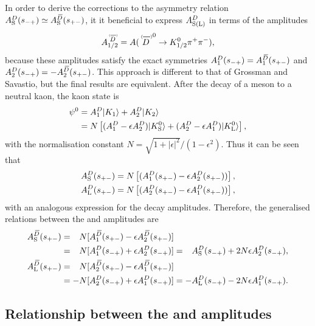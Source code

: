 
In order to derive the corrections to the asymmetry relation $A_{\rm S}^{D}(s_{-+})\simeq A_{\rm S}^{{\kern 0.18em\overline{\kern -0.18em D}}}(s_{+-})$, it it beneficial to express $A^{D}_\text{S(L)}$ in terms of the amplitudes
\begin{align}
   A_{1/2}^{\scaleto{\DorDbar}{9pt}} = 
   A({\DorDbar}^0\to K^0_\text{1/2} \pi^+\pi^-),
\end{align}
 because these amplitudes satisfy the exact symmetries 
 $A_1^{{D}}(s_{-+}) = A_1^{{{\kern 0.18em\overline{\kern -0.18em D}}}}(s_{+-})$
and
 $A_2^{{D}}(s_{-+}) = -A_2^{{{\kern 0.18em\overline{\kern -0.18em D}}}}(s_{+-})$. This approach is different to that of Grossman and Savastio, but the final results are equivalent. 
 After the decay of a \Dz meson to a neutral kaon, the kaon state is
\begin{align}
\begin{split}
    \psi^0 &= A^{D}_1 |K_1\rangle + A^{D}_2|K_2\rangle \\
    &= N\left[(A^{D}_1-\epsilon A^{D}_2)|{{K}^0_{\mathrm{S}}}\rangle
    + (A^{D}_2-\epsilon A^{D}_1)|{{K}^0_{\mathrm{L}}}\rangle\right],
\end{split}
\end{align}
with the normalisation constant $N=\sqrt{1+|\epsilon|^2}/(1-\epsilon^2)$. Thus it can be seen that
\begin{align}
\begin{split}\label{eq:A12toKS}
    A^{D}_\text{S}(s_{+-}) &= N\left[(A^{D}_1(s_{+-})-\epsilon A^{D}_2(s_{+-}))\right], \\
    A^{D}_\text{L}(s_{+-}) &= N\left[(A^{D}_2(s_{+-})-\epsilon A^{D}_1(s_{+-}))\right],
\end{split}
\end{align}
with an analogous expression for the \Dzb decay amplitudes. Therefore, the  generalised relations between the \Dz and \Dzb amplitudes are
\begin{align}
\begin{split}\label{eq:DDbar_relations}
    A_{\rm S}^{{\kern 0.18em\overline{\kern -0.18em D}}}(s_{+-}) &= \phantom{-}N[A^{\kern 0.18em\overline{\kern -0.18em D}}_1(s_{+-})-\epsilon A^{\kern 0.18em\overline{\kern -0.18em D}}_2(s_{+-})]
    \\
    &= \phantom{-}N[A^{D}_1(s_{-+})+\epsilon A^{D}_2(s_{-+})]  = \phantom{-}A_{\rm S}^{D}(s_{-+}) + 2N\epsilon A^{D}_2(s_{-+}),
    \\
    A_{\rm L}^{{\kern 0.18em\overline{\kern -0.18em D}}}(s_{+-}) &= \phantom{-}N [A^{\kern 0.18em\overline{\kern -0.18em D}}_2(s_{+-})-\epsilon A^{\kern 0.18em\overline{\kern -0.18em D}}_1(s_{+-}) ]
    \\
    & = -N[A^{D}_2(s_{-+})+\epsilon A^{D}_1(s_{-+})] = -A_{\rm L}^{D}(s_{-+}) - 2N\epsilon A^{D}_1(s_{-+}).
\end{split}
\end{align} 

\subsection{\texorpdfstring{Relationship between the \KS and \KL amplitudes}{Relationship between the KS and KL amplitudes}} %
\label{sub:relationship_between_the_ks_and_kl_amplitudes}

